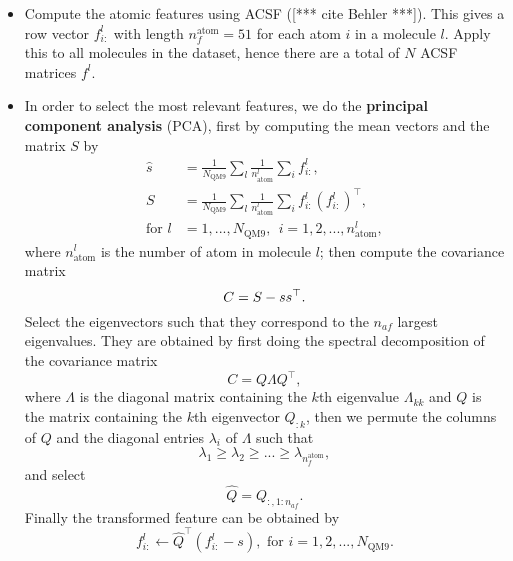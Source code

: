 \documentclass[12pt]{article}
\def\att{                    %
        \marginpar[ \hspace*{\fill} \raisebox{-0.2em}{\rule{2mm}{1.2em}} ]
        {\raisebox{-0.2em}{\rule{2mm}{1.2em}} }
        }
\def\at#1{[*** \att #1 ***]}  %
\begin{document}
\begin{itemize}
	\item Compute the atomic features using ACSF (\at{cite Behler}). This gives a row vector $f^l_{i:}$ with length $n^\text{atom}_f = 51$ for each atom $i$ in a molecule $l$. Apply this to all molecules in the dataset, hence there are a total of $N$ ACSF matrices $f^l$.
	\item In order to select the most relevant features, we do the \textbf{principal component analysis} (PCA), first by computing the mean vectors and the matrix $S$ by
	\begin{equation}
		\begin{split}
			\hat{s} &= \frac{1}{N_\text{QM9}}\sum_{l} \frac{1}{n^l_\text{atom}}\sum_{i} f^l_{i:}, \\ 
			S &= \frac{1}{N_\text{QM9}}\sum_{l} \frac{1}{n^l_\text{atom}} \sum_{i} f^l_{i:} (f^l_{i:})^\top, \\ 
			\text{for } l &= 1,...,N_\text{QM9}, ~~ i = 1,2,...,n^l_\text{atom},
		\end{split}
	\end{equation}
	where $n^l_\text{atom}$ is the number of atom in molecule $l$; then compute the covariance matrix
	\begin{equation}
		\label{eq:pca_atom_start}
		C = S - ss^\top. \\			
	\end{equation}
	Select the eigenvectors such that they correspond to the $n_{af}$ largest eigenvalues. They are obtained by first doing the spectral decomposition of the covariance matrix
	\begin{equation}
		C = Q\Lambda Q^\top,
	\end{equation}
	where $\Lambda$ is the diagonal matrix containing the $k$th eigenvalue $\Lambda_{kk}$ and $Q$ is the matrix containing the $k$th eigenvector $Q_{:k}$, then we permute the columns of $Q$ and the diagonal entries $\lambda_i$ of $\Lambda$ such that
	\begin{equation}
		\lambda_{1} \geq \lambda_{2} \geq  ... \geq \lambda_{n^\text{atom}_f},
	\end{equation}
	and select
	\begin{equation}
		\hat{Q} = Q_{:, 1:n_{af}}.
	\end{equation}
	Finally the transformed feature can be obtained by
	\begin{equation}
		\label{eq:pca_atom_end}
		f^l_{i:} \leftarrow \hat{Q}^\top(f^l_{i:} - s), \text{ for }i = 1,2,...,N_\text{QM9}.
	\end{equation}

\end{itemize}
\end{document}
